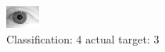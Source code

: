 \begin{figure}[h!]
\begin{center}
\includegraphics[width=0.60\columnwidth]{figures/ID2090_class_4_target_3.png}
\end{center}
\caption{ Classification: 4 actual target: 3}
\label{fig:ID2090_class_4_target_3}
\end{figure}
